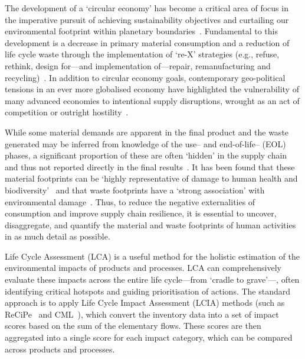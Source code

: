 
The development of a `circular economy' has become a critical area of focus in the imperative pursuit of achieving sustainability objectives and curtailing our environmental footprint within planetary boundaries~\citep{eu2019greendeal, eu2020circ,nl2023ceplan,nl2016ceplan,pardo2018ce,ellenmacarthur2015ce}. Fundamental to this development is a decrease in primary material consumption and a reduction of life cycle waste through the implementation of `re-X' strategies (e.g., refuse, rethink, design for---and implementation of---repair, remanufacturing and recycling)~\citep{eu2022ecodesign, eu2022repair,eu2015reman}. In addition to circular economy goals, contemporary geo-political tensions in an ever more globalised economy have highlighted the vulnerability of many advanced economies to intentional supply disruptions, wrought as an act of competition or outright hostility~\citep{jrc2023supplychain,hartley2024cepolitics,berry2023crm}.

While some material demands are apparent in the final product and the waste generated may be inferred from knowledge of the use-- and end-of-life-- (EOL) phases, a significant proportion of these are often `hidden' in the supply chain and thus not reported directly in the final results~\citep{laurenti2016wastefootprint,salviulo2021supplychain}. It has been found that these material footprints can be `highly representative of damage to human health and biodiversity'~\citep{steinmann2017resourcefootprints} and that waste footprints have a `strong association' with environmental damage~\citep{laurenti2023wastefootprint}. Thus, to reduce the negative externalities of consumption and improve supply chain resilience, it is essential to uncover, disaggregate, and quantify the material and waste footprints of human activities in as much detail as possible.

Life Cycle Assessment (LCA) is a useful method for the holistic estimation of the environmental impacts of products and processes. LCA can comprehensively evaluate these impacts across the entire life cycle---from `cradle to grave'---, often identifying critical hotspots and guiding prioritisation of actions. The standard approach is to apply Life Cycle Impact Assessment (LCIA) methods (such as ReCiPe~\citep{huijbregts2016recipe} and CML~\citep{guinee2002cml}), which convert the inventory data into a set of impact scores based on the sum of the elementary flows. These scores are then aggregated into a single score for each impact category, which can be compared across products and processes.

